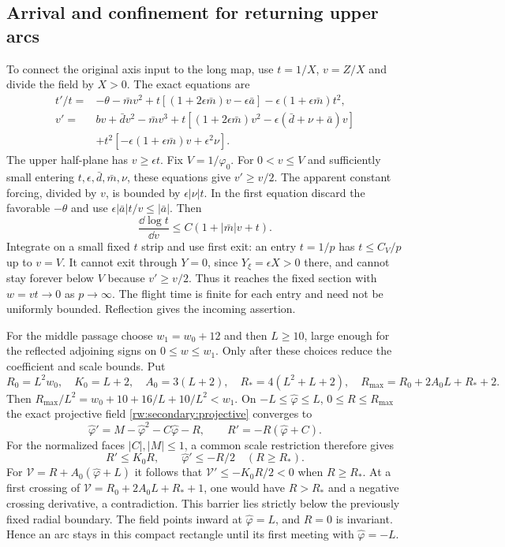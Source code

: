 \subsection{Arrival and confinement for returning upper arcs}
\label{rw:app:secondary-barriers}

To connect the original axis input to the long map, use
$t=1/X$, $v=Z/X$ and divide the field by $X>0$.
The exact equations are
\[
\begin{aligned}
 t'/t={}&-\theta-\bar m v^2+
 t[(1+2\epsilon\bar m)v-\epsilon\bar a]
                  -\epsilon(1+\epsilon\bar m)t^2,\\
 v'={}&bv+\bar d v^2-\bar m v^3
 +t[(1+2\epsilon\bar m)v^2
                -\epsilon(\bar d+\nu+\bar a)v]\\
 &+t^2[-\epsilon(1+\epsilon\bar m)v+\epsilon^2\nu].
\end{aligned}
\]
The upper half-plane has $v\ge\epsilon t$. Fix
$V=1/\varphi_0$. For $0<v\le V$ and sufficiently small entering
$t,\epsilon,\bar d,\bar m,\nu$, these equations give $v'\ge v/2$.
The apparent constant forcing, divided by $v$, is bounded by
$\epsilon|\nu|t$. In the first equation discard the favorable
$-\theta$ and use $\epsilon|\bar a|t/v\le|\bar a|$.
Then
\[
 \frac{\dd\log t}{\dd v}\le C(1+|\bar m|v+t).
\]
Integrate on a small fixed $t$ strip and use first exit: an entry
$t=1/p$ has $t\le C_V/p$ up to $v=V$. It cannot exit through
$Y=0$, since $Y_\xi=\epsilon X>0$ there, and cannot stay forever
below $V$ because $v'\ge v/2$. Thus it reaches the fixed section
with $w=vt\to0$ as $p\to\infty$. The flight time is finite for
each entry and need not be uniformly bounded. Reflection gives
the incoming assertion.

For the middle passage choose $w_1=w_0+12$ and then $L\ge10$,
large enough for the reflected adjoining signs on $0\le w\le w_1$.
Only after these choices reduce the coefficient and scale bounds.
Put
\[
 R_0=L^2w_0,\quad K_0=L+2,\quad A_0=3(L+2),\quad
 R_*=4(L^2+L+2),\quad
 R_{\max}=R_0+2A_0L+R_*+2 .
\]
Then $R_{\max}/L^2=w_0+10+16/L+10/L^2<w_1$.
On $-L\le\hat\varphi\le L$, $0\le R\le R_{\max}$ the exact
projective field \eqref{rw:secondary:projective} converges to
\[
 \hat\varphi'=M-\hat\varphi^2-C\hat\varphi-R,\qquad
 R'=-R(\hat\varphi+C).
\]
For the normalized faces $|C|,|M|\le1$, a common scale restriction
therefore gives
\[
 R'\le K_0R,\qquad \hat\varphi'\le-R/2\quad(R\ge R_*).
\]
For $\mathcal V=R+A_0(\hat\varphi+L)$ it follows that
$\mathcal V'\le-K_0R/2<0$ when $R\ge R_*$.
At a first crossing of
$\mathcal V=R_0+2A_0L+R_*+1$, one would have $R>R_*$ and a
negative crossing derivative, a contradiction. This barrier lies
strictly below the previously fixed radial boundary.
The field points inward at $\hat\varphi=L$, and $R=0$ is invariant.
Hence an arc stays in this compact rectangle until its first meeting
with $\hat\varphi=-L$.

